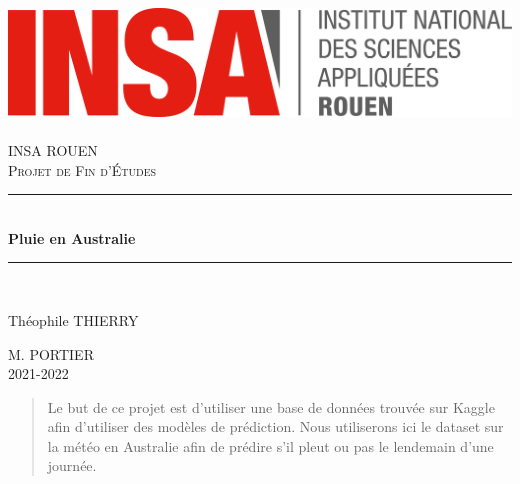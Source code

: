 \documentclass{article}
\begin{document}
\newcommand{\HRule}{\rule{\linewidth}{0.5mm}}

\begin{titlepage}
  \begin{sffamily}
  \begin{center}
    \hfill
    \includegraphics[scale=0.06]{./Images/logoINSARouen.png}~\\[1.5cm]

    \textsc{\LARGE INSA ROUEN}\\[1cm]

    \textsc{\Large Projet de Fin d'Études}\\[1cm]

    \HRule \\[0.4cm]
    { \huge \bfseries Pluie en Australie\\[0.4cm] }

    \HRule \\[1cm]

    \begin{minipage}{0.4\textwidth}
      \begin{flushleft} \large
        Théophile THIERRY\\
      \end{flushleft}
    \end{minipage}
    \begin{minipage}{0.4\textwidth}
      \begin{flushright} \large
        \textsc{M. PORTIER}\\
         2021-2022\\
      \end{flushright}
    \end{minipage}

    \vfill

  \end{center}
  \end{sffamily}
\end{titlepage}

\tableofcontents
\listoffigures
\listoftables
\newpage

\begin{abstract}
Le but de ce projet est d'utiliser une base de données trouvée sur Kaggle afin d'utiliser des modèles de prédiction. Nous utiliserons ici le dataset sur la météo en Australie afin de prédire s'il pleut ou pas le lendemain d'une journée. 
\end{abstract}
\end{document}
